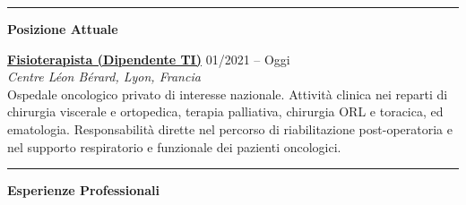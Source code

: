 \documentclass[a4paper]{article}
\newcommand{\block}[1]{\hrule \vspace{0.2cm} \textbf{\Large #1} \vspace{0.2cm}}
\newcommand{\voice}[5]{\href{#4}{\textbf{#1}} \hfill #2 \\ \textit{#3} \\ {\small #5} \vspace{0.2cm} \\}
\begin{document}
\begin{minipage}[t]{0.6\columnwidth}

    \block{Posizione Attuale}

    \voice{Fisioterapista (Dipendente TI)}
    {01/2021 -- Oggi}
    {Centre Léon Bérard, Lyon, Francia}
    {https://www.centreleonberard.fr/en}
    {
        Ospedale oncologico privato di interesse nazionale.
    Attività clinica nei reparti di chirurgia viscerale e ortopedica, terapia palliativa, chirurgia ORL e toracica, ed ematologia.
    Responsabilità dirette nel percorso di riabilitazione post-operatoria e nel supporto respiratorio e funzionale dei pazienti oncologici.%
    }

    \block{Esperienze Professionali}


\end{minipage}
\end{document}
